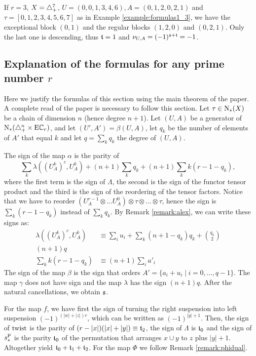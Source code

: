 \begin{example}
	If $r=3$, $X= \triangle_{+}^7$, $U = (0,0,1,3,4,6), A = (0,1,2,0,2,1)$ and $\tau = [0,1,2,3,4,5,6,7]$ as in Example \ref{example:formulas1_3}, we have the exceptional block $(0,1)$ and the regular blocks $(1,2,0)$ and $(0,2,1)$. Only the last one is descending, thus $\mathfrak{t} = 1$ and $\nu_{U,A} = (-1)^{\mathfrak{s}+\mathfrak{t}} = -1$.
\end{example}

\subsection{Explanation of the formulas for any prime number \texorpdfstring{$r$}{r}} Here we justify the formulas of this section using the main theorem of the paper. A complete read of the paper is necessary to follow this section. Let $\tau\in \operatorname{N}_{*}(X)$ be a chain of dimension $n$ (hence degree $n+1$). Let $(U,A)$ be a generator of $\operatorname{N}_{*}(\triangle_{+}^n\times \mathrm{E}\mathbb{C}_r)$, and let $(U',A') = \beta(U,A)$, let $q_k$ be the number of elements of $A'$ that equal $k$ and let $q = \sum_{k}q_k$ the degree of $(U,A)$.

The sign of the map $\alpha$ is the parity of 
\[
	\sum_{k}\lambda((U_A^{k})^c,U_A^k) + (n+1)\sum_k q_k + (n+1)\sum_kk(r-1-q_k),
\]
where the first term is the sign of $\Lambda$, the second is the sign of the functor tensor product and the third is the sign of the reordering of the tensor factors. Notice that we have to reorder $(U^{r-1}_A\otimes \ldots U^0_A)\otimes \tau\otimes\ldots\otimes \tau$, hence the sign is $\sum_k(r-1-q_k)$ instead of $\sum_k q_k$. By Remark \ref{remark:alex}, we can write these signs as:
\begin{align}
\label{signo:lambda}	\lambda((U_A^k)^c,U^k_A) &\equiv \sum_i u_i + \sum_k(n+1-q_k)q_k + \binom{q_k}{2}
\\
\label{signo:prod} (n+1)q
\\
 \label{signo:reord} \sum_kk(r-1-q_k)&\equiv (n+1)\sum_{i} a'_i
\end{align}
The sign of the map $\beta$ is the sign that orders $A'  = \{a_i+u_i\mid i=0,\ldots,q-1\}$. The map $\gamma$ does not have sign and the map $\lambda$ has the sign $(n+1)q$. After the natural cancellations, we obtain $\mathfrak{s}$.

For the map $f$, we have first the sign of turning the right suspension into left suspension $(-1)^{(|w|+|z|)r}$, which can be written as $(-1)^{|y|+1}$. Then, the sign of $\operatorname{twist}$ is the parity of $(r-|x|)(|x|+|y|) \equiv \mathfrak{t}_2$, the sign of $\Lambda$ is $\mathfrak{t}_0$ and the sign of $s_*^{\operatorname{P}}$ is the parity $\mathfrak{t}_0$ of the permutation that arranges $x\cup y$ to $z$ plus $|y|+1$. Altogether yield $\mathfrak{t}_0+\mathfrak{t}_1+\mathfrak{t}_2$. For the map $\Phi$ we follow Remark \ref{remark:phidual}.

